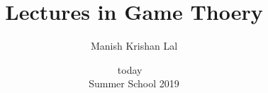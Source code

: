 \newcommand\xylabel[3]{%
  \setlength{\unitlength}{0.18\textwidth}
  \begin{picture}(1,1)
    \put(0,0){\texttt{[image: \#1]}}
    \put(0.85,0.325){\small#2}
    \put(0.275,0.875){\small#3}
  \end{picture}
}

\newcommand\xyzlabel[4]{%
  \setlength{\unitlength}{0.18\textwidth}
  \begin{picture}(1,1)
    \put(0,0){\texttt{[image: \#1]}}
    \put(0.85,0.25){\small#2}
    \put(0.25,0.1){\small#3}
    \put(0.325,0.85){\small#4}
  \end{picture}
}



\makeatletter%
  \def\mystretch{1.75} 
  \newcommand\publishers[1]{\newcommand\@publishers{#1}} 
  \renewcommand{\labelenumi}{\alph{enumi})} 
  \renewcommand{\labelenumii}{(\roman{enumii})}
  \setlength{\parindent}{0pt} 
\makeatother%

\title{Lectures in Game Thoery}
\author{Manish Krishan Lal}
\date{today ~\vspace{0.2cm} \\ Summer School 2019}
\publishers{ICTS-DCS}

\newcommand{\N}{\mathbb{N}}
\newcommand{\Q}{\mathbb{Q}}
\newcommand{\Z}{\mathbb{Z}}

\renewcommand*{\qed}{\hfill\ensuremath{\square}}

